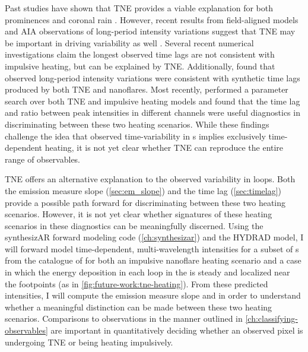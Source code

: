 Past studies have shown that TNE provides a viable explanation for both prominences \citep{antiochos_model_1991,muller_dynamics_2003} and coronal rain \citep{antolin_coronal_2010,antolin_multithermal_2015,auchere_coronal_2018}. However, recent results from field-aligned models \citep{mikic_importance_2013} and AIA observations of long-period intensity variations \citep{auchere_long-period_2014,froment_evidence_2015,auchere_thermal_2016} suggest that TNE may be important in driving \AR{} variability as well \citep[though see][]{klimchuk_can_2010}. Several recent numerical investigations \citep{lionello_can_2016,winebarger_investigation_2016} claim the longest observed time lags are not consistent with impulsive heating, but can be explained by TNE. Additionally, \citet{froment_long-period_2017} found that observed long-period intensity variations were consistent with synthetic time lags produced by both TNE and nanoflares. Most recently, \citet{winebarger_identifying_2018} performed a parameter search over both TNE and impulsive heating models and found that the time lag and ratio between peak intensities in different channels were useful diagnostics in discriminating between these two heating scenarios. While these findings challenge the idea that observed time-variability in \AR s implies exclusively time-dependent heating, it is not yet clear whether TNE can reproduce the entire range of observables.

TNE offers an alternative explanation to the observed variability in \AR{} loops. Both the emission measure slope (\autoref{sec:em_slope}) and the time lag (\autoref{sec:timelag}) provide a possible path forward for discriminating between these two heating scenarios. However, it is not yet clear whether signatures of these heating scenarios in these diagnostics can be meaningfully discerned. Using the synthesizAR forward modeling code (\autoref{ch:synthesizar}) and the HYDRAD model, I will forward model time-dependent, multi-wavelength intensities for a subset of \AR s from the catalogue of \citet{warren_systematic_2012} for both an impulsive nanoflare heating scenario and a case in which the energy deposition in each loop in the \AR{} is steady and localized near the footpoints (as in \autoref{fig:future-work:tne-heating}). From these predicted intensities, I will compute the emission measure slope and in order to understand whether a meaningful distinction can be made between these two heating scenarios. Comparisons to observations in the manner outlined in \autoref{ch:classifying-observables} are important in quantitatively deciding whether an observed pixel is undergoing TNE or being heating impulsively.

